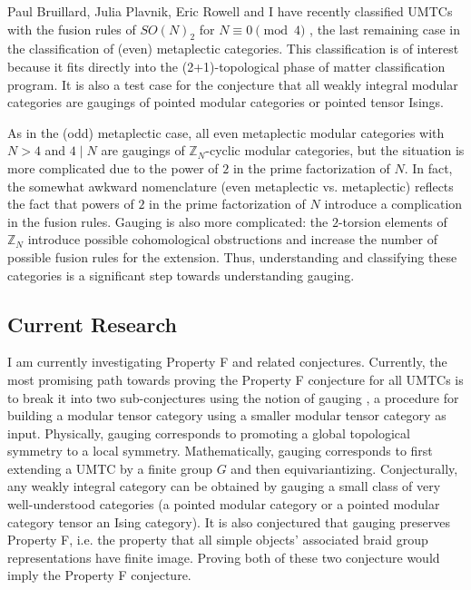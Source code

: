 \documentclass[12pt]{article}
\newcommand{\ZZ}{\mathbb{Z}}
\theoremstyle{plain} \numberwithin{equation}{section}
\theoremstyle{definition}
\begin{document}
Paul Bruillard, Julia Plavnik, Eric Rowell and I have recently classified UMTCs with the fusion rules of $SO(N)_2$ for $N \equiv 0 \pmod{4}$ \cite{bgpr}, the last remaining case in the classification of (even) metaplectic categories.  This classification is of interest because it fits directly into the (2+1)-topological phase of matter classification program.  It is also a test case for the conjecture that all weakly integral modular categories are gaugings of pointed modular categories or pointed tensor Isings.

As in the (odd) metaplectic case,  all even metaplectic modular categories with $N > 4$ and $4 \mid N$ are gaugings of $\ZZ_{N}$-cyclic modular categories, but the situation is more complicated due to the power of $2$ in the prime factorization of $N$. In fact, the somewhat awkward nomenclature (even metaplectic vs. metaplectic) reflects the fact that powers of $2$ in the prime factorization of $N$ introduce a complication in the fusion rules.   Gauging is also more complicated: the $2$-torsion elements of $\ZZ_N$ introduce possible cohomological obstructions and increase the number of possible fusion rules for the extension.  Thus, understanding and classifying these categories is a significant step towards understanding gauging.

\subsection*{Current Research}

I am currently investigating Property F and related conjectures.  Currently, the most promising path towards proving the Property F conjecture for all UMTCs is to break it into two sub-conjectures using the notion of gauging \cite{bbcw}, a procedure for building a modular tensor category using  a smaller modular tensor category as input.   Physically, gauging corresponds to promoting a global topological symmetry to a local symmetry.  Mathematically, gauging corresponds to first extending a UMTC by a finite group $G$ and then equivariantizing. Conjecturally, any weakly integral category can be obtained by gauging a small class of very well-understood categories (a pointed modular category or a pointed modular category tensor an Ising category).   It is also conjectured that gauging  preserves Property F, i.e. the property that all simple objects’ associated braid group representations have finite image.  Proving both of these two conjecture would imply the Property F conjecture.
\end{document}
